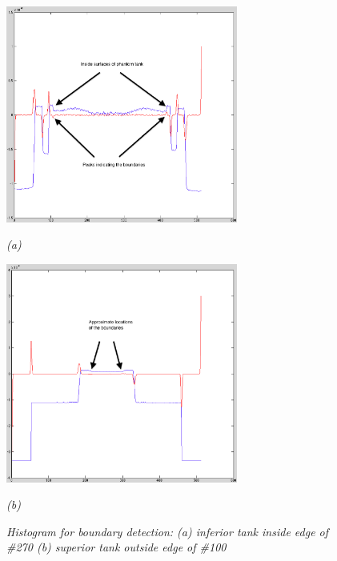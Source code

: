 \begin{figure}[htb]
  \begin{minipage}[b]{3in}
    \centering
    \centerline{\mbox{\includegraphics[width=3in]{data_extraction/images/sample/20121017_270/Coronal/inferior_inside/histogram_marked.eps}}}
    \centerline{\emph{(a)}}
  \end{minipage}
  \hfill
  \begin{minipage}[b]{3in}
    \centering
    \centerline{\mbox{\includegraphics[width=3in]{data_extraction/images/sample/20121017_100/Coronal/superior_outside/superior_outside_histogram_marked.eps}}}
    \centerline{\emph{(b)}}
  \end{minipage}

  \caption{\emph{Histogram for boundary detection: (a) inferior tank inside edge of \#270 (b) superior tank outside edge of \#100}}
  \label{fig:coronal_boundaries_histogram}
\end{figure}


